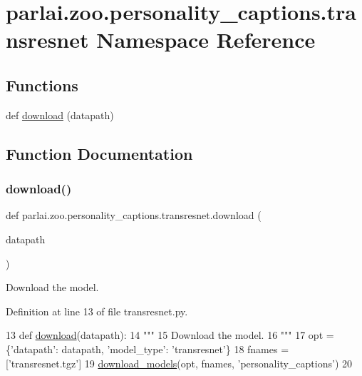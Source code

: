 \hypertarget{namespaceparlai_1_1zoo_1_1personality__captions_1_1transresnet}{}\section{parlai.\+zoo.\+personality\+\_\+captions.\+transresnet Namespace Reference}
\label{namespaceparlai_1_1zoo_1_1personality__captions_1_1transresnet}
\subsection*{Functions}
\begin{DoxyCompactItemize}
\item 
def \hyperlink{namespaceparlai_1_1zoo_1_1personality__captions_1_1transresnet_a3bc7fd4d2fb757f3481c3dab3355ef12}{download} (datapath)
\end{DoxyCompactItemize}


\subsection{Function Documentation}
\mbox{\label{namespaceparlai_1_1zoo_1_1personality__captions_1_1transresnet_a3bc7fd4d2fb757f3481c3dab3355ef12}} 
\subsubsection{\texorpdfstring{download()}{download()}}
{\footnotesize\ttfamily def parlai.\+zoo.\+personality\+\_\+captions.\+transresnet.\+download (\begin{DoxyParamCaption}\item[{}]{datapath }\end{DoxyParamCaption})}

\begin{DoxyVerb}Download the model.
\end{DoxyVerb}
 

Definition at line 13 of file transresnet.\+py.


\begin{DoxyCode}
13 \textcolor{keyword}{def }\hyperlink{namespaceparlai_1_1zoo_1_1personality__captions_1_1transresnet_a3bc7fd4d2fb757f3481c3dab3355ef12}{download}(datapath):
14     \textcolor{stringliteral}{"""}
15 \textcolor{stringliteral}{    Download the model.}
16 \textcolor{stringliteral}{    """}
17     opt = \{\textcolor{stringliteral}{'datapath'}: datapath, \textcolor{stringliteral}{'model\_type'}: \textcolor{stringliteral}{'transresnet'}\}
18     fnames = [\textcolor{stringliteral}{'transresnet.tgz'}]
19     \hyperlink{namespaceparlai_1_1core_1_1build__data_ab697f23f05d3e36d7979fe5e0ed7911e}{download\_models}(opt, fnames, \textcolor{stringliteral}{'personality\_captions'})
20 \end{DoxyCode}
